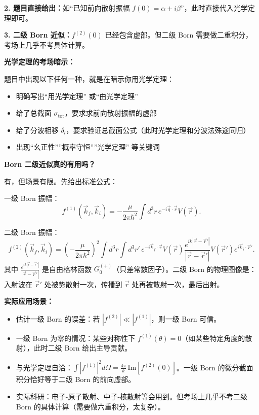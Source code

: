 \begin{derivationbox}
\textbf{2. 题目直接给出：}如``已知前向散射振幅 $f(0) = \alpha + i\beta$''，此时直接代入光学定理即可。

\textbf{3. 二级 Born 近似：}$f^{(2)}(0)$ 已经包含虚部。但二级 Born 需要做二重积分，考场上几乎不考具体计算。

\textbf{光学定理的考场暗示：}

题目中出现以下任何一种，就是在暗示你用光学定理：
\begin{itemize}
    \item 明确写出``用光学定理'' 或``由光学定理''
    \item 给了总截面 $\sigma_{\text{tot}}$，要求求前向散射振幅的虚部
    \item 给了分波相移 $\delta_l$，要求验证总截面公式（此时光学定理和分波法殊途同归）
    \item 出现``幺正性''''概率守恒''''光学定理'' 等关键词
\end{itemize}

\textbf{Born 二级近似真的有用吗？}

有，但场景有限。先给出标准公式：

一级 Born 振幅：
\[
f^{(1)}(\vec{k}_f, \vec{k}_i) = -\frac{\mu}{2\pi\hbar^2} \int d^3r \, e^{-i\vec{q}\cdot\vec{r}} V(\vec{r}).
\]

二级 Born 振幅：
\[
f^{(2)}(\vec{k}_f, \vec{k}_i) = \left(-\frac{\mu}{2\pi\hbar^2}\right)^2 \int d^3r \int d^3r' \, e^{-i\vec{k}_f\cdot\vec{r}} V(\vec{r}) \frac{e^{ik|\vec{r}-\vec{r}'|}}{|\vec{r}-\vec{r}'|} V(\vec{r}') e^{i\vec{k}_i\cdot\vec{r}'}.
\]
其中 $\frac{e^{ik|\vec{r}-\vec{r}'|}}{|\vec{r}-\vec{r}'|}$ 是自由格林函数 $G_0^{(+)}$（只差常数因子）。二级 Born 的物理图像是：入射波在 $\vec{r}'$ 处被势散射一次，传播到 $\vec{r}$ 处再被散射一次，最后出射。

\textbf{实际应用场景：}
\begin{itemize}
    \item 估计一级 Born 的误差：若 $|f^{(2)}| \ll |f^{(1)}|$，则一级 Born 可信。
    \item 一级 Born 为零的情况：某些对称性下 $f^{(1)}(\theta) = 0$（如某些特定角度的散射），此时二级 Born 给出主导贡献。
    \item 与光学定理自洽：$\int |f^{(1)}|^2 d\Omega = \frac{4\pi}{k}\, \text{Im}[f^{(2)}(0)]$。一级 Born 的微分截面积分恰好等于二级 Born 的前向虚部。
    \item 实际科研：电子-原子散射、中子-核散射等会用到。但考场上几乎不考二级 Born 的具体计算（需要做六重积分，太复杂）。
\end{itemize}


\end{derivationbox}
